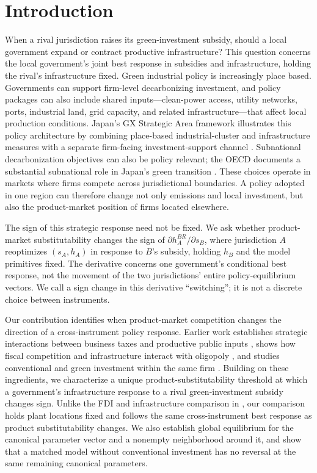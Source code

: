 \section{Introduction}
\label{sec:introduction}

When a rival jurisdiction raises its green-investment subsidy, should a local government expand or contract productive infrastructure? This question concerns the local government's joint best response in subsidies and infrastructure, holding the rival's infrastructure fixed. Green industrial policy is increasingly place based. Governments can support firm-level decarbonizing investment, and policy packages can also include shared inputs---clean-power access, utility networks, ports, industrial land, grid capacity, and related infrastructure---that affect local production conditions. Japan's GX Strategic Area framework illustrates this policy architecture by combining place-based industrial-cluster and infrastructure measures with a separate firm-facing investment-support channel \citep{METIGX2026,METIGXSubsidy2026}. Subnational decarbonization objectives can also be policy relevant; the OECD documents a substantial subnational role in Japan's green transition \citep{OECDJapan2025}. These choices operate in markets where firms compete across jurisdictional boundaries. A policy adopted in one region can therefore change not only emissions and local investment, but also the product-market position of firms located elsewhere.

The sign of this strategic response need not be fixed. We ask whether product-market substitutability changes the sign of $\partial h_A^{BR}/\partial s_B$, where jurisdiction $A$ reoptimizes $(s_A,h_A)$ in response to $B$'s subsidy, holding $h_B$ and the model primitives fixed. The derivative concerns one government's conditional best response, not the movement of the two jurisdictions' entire policy-equilibrium vectors. We call a sign change in this derivative ``switching''; it is not a discrete choice between instruments.

Our contribution identifies when product-market competition changes the direction of a cross-instrument policy response. Earlier work establishes strategic interactions between business taxes and productive public inputs \citep{HauptmeierMittermaierRincke2012,BenassyQuereGobalrajaTrannoy2007}, shows how fiscal competition and infrastructure interact with oligopoly \citep{MoritaOkoshi2025}, and studies conventional and green investment within the same firm \citep{StrandholmEspinolaMunoz2025}. Building on these ingredients, we characterize a unique product-substitutability threshold at which a government's infrastructure response to a rival green-investment subsidy changes sign. Unlike the FDI and infrastructure comparison in \citet{MoritaOkoshi2025}, our comparison holds plant locations fixed and follows the same cross-instrument best response as product substitutability changes. We also establish global equilibrium for the canonical parameter vector and a nonempty neighborhood around it, and show that a matched model without conventional investment has no reversal at the same remaining canonical parameters.

